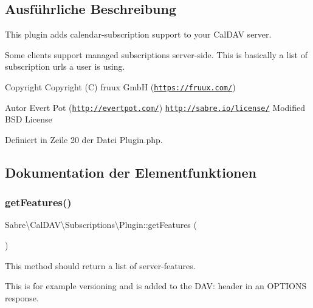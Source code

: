 \subsection{Ausführliche Beschreibung}
This plugin adds calendar-\/subscription support to your Cal\+D\+AV server.

Some clients support \textquotesingle{}managed subscriptions\textquotesingle{} server-\/side. This is basically a list of subscription urls a user is using.

\begin{DoxyCopyright}{Copyright}
Copyright (C) fruux GmbH (\href{https://fruux.com/}{\tt https\+://fruux.\+com/}) 
\end{DoxyCopyright}
\begin{DoxyAuthor}{Autor}
Evert Pot (\href{http://evertpot.com/}{\tt http\+://evertpot.\+com/})  \href{http://sabre.io/license/}{\tt http\+://sabre.\+io/license/} Modified B\+SD License 
\end{DoxyAuthor}


Definiert in Zeile 20 der Datei Plugin.\+php.



\subsection{Dokumentation der Elementfunktionen}
\mbox{\label{class_sabre_1_1_cal_d_a_v_1_1_subscriptions_1_1_plugin_ad0b77dceec94b34d4292cb5d13e22099}} 
\subsubsection{\texorpdfstring{get\+Features()}{getFeatures()}}
{\footnotesize\ttfamily Sabre\textbackslash{}\+Cal\+D\+A\+V\textbackslash{}\+Subscriptions\textbackslash{}\+Plugin\+::get\+Features (\begin{DoxyParamCaption}{ }\end{DoxyParamCaption})}

This method should return a list of server-\/features.

This is for example \textquotesingle{}versioning\textquotesingle{} and is added to the D\+AV\+: header in an O\+P\+T\+I\+O\+NS response.

